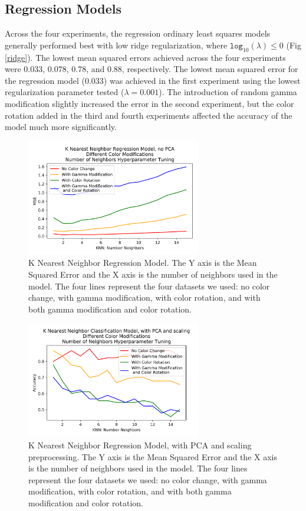 \documentclass[journal]{IEEEtran}
\begin{document}
\subsection{Regression Models}

Across the four experiments, the regression ordinary least squares models generally performed best with low ridge regularization, where $\texttt{log}_{10}(\lambda) \leq 0$  (Fig \ref{ridge}). The lowest mean squared errors achieved across the four experiments were $0.033$, $0.078$, $0.78$, and $0.88$, respectively. The lowest mean squared error for the regression model ($0.033$) was achieved in the first experiment using the lowest regularization parameter tested ($\lambda = 0.001$). The introduction of random gamma modification slightly increased the error in the second experiment, but the color rotation added in the third and fourth experiments affected the accuracy of the model much more significantly.

\begin{figure}
\centering
\includegraphics[height=2in]{KNN_reg_noPCA/knn_regression.png}
\caption{K Nearest Neighbor Regression Model. The Y axis is the Mean Squared Error and the X axis is the number of neighbors used in the model. The four lines represent the four datasets we used: no color change, with gamma modification, with color rotation, and with both gamma modification and color rotation.}
\label{Rknn}
\end{figure}

\begin{figure}
\centering
\includegraphics[height=2in]{KNN_clf_PCA/knn_classification.png}
\caption{K Nearest Neighbor Regression Model, with PCA and scaling preprocessing. The Y axis is the Mean Squared Error and the X axis is the number of neighbors used in the model. The four lines represent the four datasets we used: no color change, with gamma modification, with color rotation, and with both gamma modification and color rotation.}
\label{Rknn_pca}
\end{figure}
\end{document}
